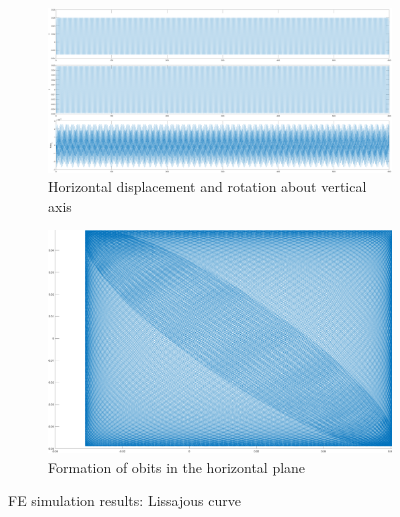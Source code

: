 \documentclass{article}
\begin{document}
\begin{figure}
\centering
    \begin{subfigure}[b]{0.45\textwidth}
        \centering
        \includegraphics[width=\textwidth]{manuscript/figures/FEA_simu_Lissa_Displacement.png}
        \caption{\small{Horizontal displacement and rotation about vertical axis}}
        \label{fig:fea:lissa_displ}
    \end{subfigure}
    \begin{subfigure}[b]{0.45\textwidth}
        \centering
        \includegraphics[width=\textwidth]{manuscript/figures/FEA_simu_Lissa_Orbits.png}
        \caption{\small{Formation of obits in the horizontal plane}}
        \label{fig:fea:lissa_orbits}
    \end{subfigure}
\caption{FE simulation results: Lissajous curve}
    \label{fig:fea:lissa_simu_results}
\end{figure}
\end{document}
